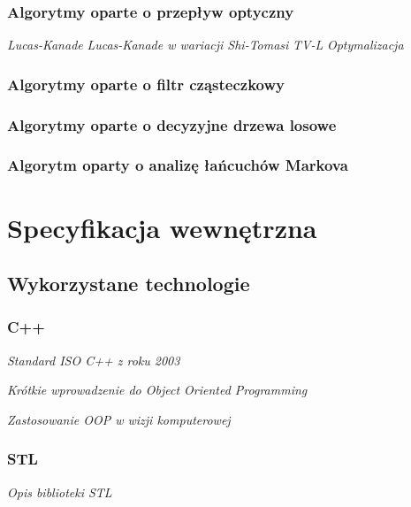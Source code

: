 \subsection{Algorytmy oparte o przepływ optyczny}\label{Subsection_OpticalFlow}
\textit{Lucas-Kanade}
\textit{Lucas-Kanade w wariacji Shi-Tomasi}
\textit{TV-L}
\textit{Optymalizacja}

\cite{LucasKanadeTracker81}
\cite{GoodFeaturesToTrack94}
\cite{TVL107}
\cite{OpticalFlowNonPriori05}

\subsection{Algorytmy oparte o filtr cząsteczkowy}\label{Subsection_ParticleFilter}
\cite{ParticleFilter05}
\cite{FingertipParticleFilter11}

\subsection{Algorytmy oparte o decyzyjne drzewa losowe}\label{Subsection_RandomizedTrees}
\cite{RandomizedTrees06}
\cite{TwoStageRandomizedTrees11}

\subsection{Algorytm oparty o analizę łańcuchów Markova}\label{Subsection_Vitterbi}
\cite{HandTrackingVitterbi05}

\chapter{Specyfikacja wewnętrzna}\label{Chapter_SpecyfikacjaWewnetrzna}

\section{Wykorzystane technologie}\label{Section_Technologie}

\subsection{C++}\label{Subsection_Cpp}
\textit{Standard ISO C++ z roku 2003}\cite{CppStroustrup}\cite{EffectiveCpp}\cite{MoreEffectiveCpp}

\textit{Krótkie wprowadzenie do Object Oriented Programming}

\textit{Zastosowanie OOP w wizji komputerowej}

\subsection{STL}\label{Subsection_STL}
\textit{Opis biblioteki STL}\cite{EffectiveStl}

